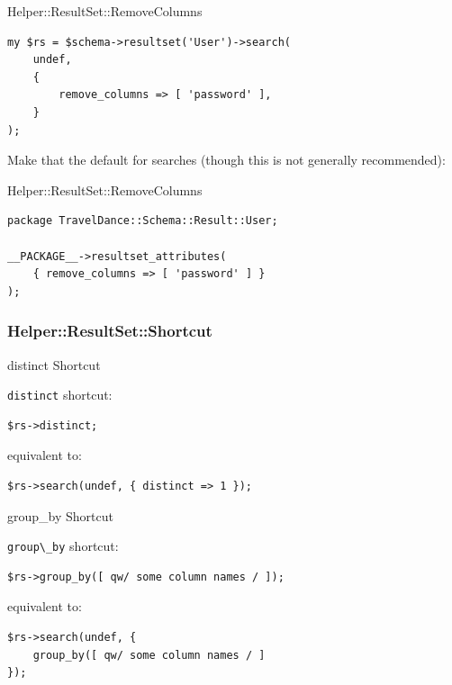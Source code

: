 \begin{frame}[fragile]{Helper::ResultSet::RemoveColumns}
\begin{lstlisting}
my $rs = $schema->resultset('User')->search(
    undef,
    {
        remove_columns => [ 'password' ],
    }
);
\end{lstlisting}
\end{frame}

Make that the default for searches (though this is not generally recommended):

\begin{frame}[fragile]{Helper::ResultSet::RemoveColumns}
\begin{lstlisting}
package TravelDance::Schema::Result::User;

__PACKAGE__->resultset_attributes(
    { remove_columns => [ 'password' ] }
);
\end{lstlisting}
\end{frame}

\subsubsection{Helper::ResultSet::Shortcut}

\begin{frame}[fragile]{distinct Shortcut}

\verb|distinct| shortcut:

\begin{lstlisting}
$rs->distinct;
\end{lstlisting}

equivalent to:

\begin{lstlisting}
$rs->search(undef, { distinct => 1 });
\end{lstlisting}
\end{frame}

\begin{frame}[fragile]{group\_by Shortcut}

\verb|group\_by| shortcut:

\begin{lstlisting}
$rs->group_by([ qw/ some column names / ]);
\end{lstlisting}

equivalent to:

\begin{lstlisting}
$rs->search(undef, { 
    group_by([ qw/ some column names / ] 
});
\end{lstlisting}
\end{frame}

